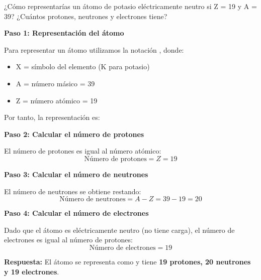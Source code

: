 \begin{exercise}
    ¿Cómo representarías un átomo de potasio eléctricamente neutro si Z = 19 y A = 39? ¿Cuántos protones, neutrones y electrones tiene?
    \begin{solu}
        \textbf{Paso 1: Representación del átomo}

        Para representar un átomo utilizamos la notación , donde:
        \begin{itemize}
            \item X = símbolo del elemento (K para potasio)
            \item A = número másico = 39
            \item Z = número atómico = 19
        \end{itemize}

        Por tanto, la representación es: 

        \textbf{Paso 2: Calcular el número de protones}

        El número de protones es igual al número atómico:
        \[
            \text{Número de protones} = Z = 19
        \]

        \textbf{Paso 3: Calcular el número de neutrones}

        El número de neutrones se obtiene restando:
        \[
            \text{Número de neutrones} = A - Z = 39 - 19 = 20
        \]

        \textbf{Paso 4: Calcular el número de electrones}

        Dado que el átomo es eléctricamente neutro (no tiene carga), el número de electrones es igual al número de protones:
        \[
            \text{Número de electrones} = 19
        \]

        \textbf{Respuesta:} El átomo se representa como  y tiene \textbf{19 protones, 20 neutrones y 19 electrones}.
    \end{solu}
\end{exercise}

